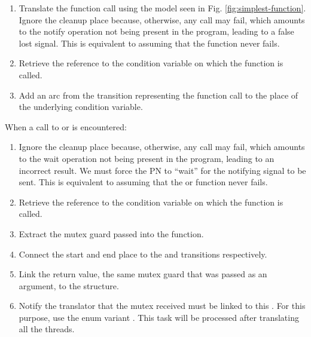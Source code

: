 \begin{enumerate}
      \item Translate the function call using the model seen in Fig. \ref{fig:simplest-function}.
            Ignore the cleanup place because, otherwise, any call may fail,
            which amounts to the notify operation not being present in the program,
            leading to a false lost signal.
            This is equivalent to assuming that the  function never fails.
      \item Retrieve the  reference to the condition variable
            on which the function is called.
      \item Add an arc from the transition representing the function call
            to the  place of the underlying condition variable.
\end{enumerate}

When a call to 
or  is encountered:

\begin{enumerate}
      \item Ignore the cleanup place because, otherwise, any call may fail,
            which amounts to the wait operation not being present in the program,
            leading to an incorrect result.
            We must force the \acrshort{PN}
            to ``wait'' for the notifying signal to be sent.
            This is equivalent to assuming that the 
            or  function never fails.
      \item Retrieve the  reference to the condition variable
            on which the function is called.
      \item Extract the mutex guard passed into the function.
      \item Connect the start and end place to the
             and  transitions respectively.
      \item Link the return value, the same mutex guard that was passed as an argument,
            to the  structure.
      \item Notify the translator that the mutex received must be linked to this .
            For this purpose, use the enum variant .
            This task will be processed after translating all the threads.
\end{enumerate}


